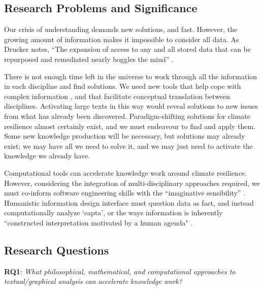 \subsection{Research Problems and Significance}

Our crisis of understanding demands new solutions, and fast. However, the growing amount of information makes it impossible to consider all data. As Drucker notes, “The expansion of access to any and all stored data that can be repurposed and remediated nearly boggles the mind” \citep[p. 194]{drucker_graphesis_2014}.

There is not enough time left in the universe to work through all the information in each discipline and find solutions. We need new tools that help cope with complex information \citep[p. 34]{sevaldson_designing_2022}, and that facilitate conceptual translation between disciplines. Activating large texts in this way would reveal solutions to new issues from what has already been discovered. Paradigm-shifting solutions for climate resilience almost certainly exist, and we must endeavour to find and apply them. Some new knowledge production will be necessary, but solutions may already exist; we may have all we need to solve it, and we may just need to activate the knowledge we already have.

Computational tools can accelerate knowledge work around climate resilience. However, considering the integration of multi-disciplinary approaches required, we must co-inform software engineering skills with the ``imaginative sensibility”  \cite[p. 194]{drucker_graphesis_2014}. Humanistic information design interface \citep[p. 178, 190-191]{drucker_graphesis_2014} must question data as fact, and instead computationally analyze `capta', or the ways information is inherently ``constructed interpretation motivated by a human agenda" \citep[p. 131]{drucker_graphesis_2014}.



\subsection{Research Questions}
\textbf{RQ1}: \textit{What philosophical, mathematical, and computational approaches to textual/graphical analysis can accelerate knowledge work?}

